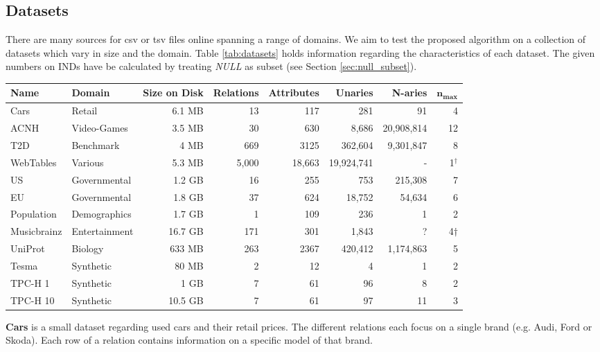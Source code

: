 \subsection{Datasets}
There are many sources for csv or tsv files online spanning a range of domains. We aim to test the proposed algorithm on a collection of datasets which vary in size and the domain. Table \ref{tab:datasets} holds information regarding the characteristics of each dataset. The given numbers on INDs have be calculated by treating \textit{NULL} as subset (see Section \ref{sec:null_subset}).

\begin{table*}[t]
    \centering
    \begin{tabular}{llrrrrrr}
        \hline
        \textbf{Name} & \textbf{Domain} & \textbf{Size on Disk} & \textbf{Relations} & \textbf{Attributes} & \textbf{Unaries} & \textbf{N-aries} & $\textbf{n}_\textbf{max}$ \\
        \hline
        Cars & Retail & 6.1 MB & 13 & 117 & 281 & 91 & 4 \\
        ACNH & Video-Games & 3.5 MB & 30 & 630 & 8,686 & 20,908,814 & 12 \\
        T2D & Benchmark & 4 MB & 669 & 3125 & 362,604 & 9,301,847 & 8 \\
        WebTables & Various & 5.3 MB & 5,000 & 18,663 & 19,924,741 & - & 1$^\dag$ \\
        US & Governmental & 1.2 GB & 16 & 255 & 753 & 215,308 & 7 \\
        EU & Governmental & 1.8 GB & 37 & 624 & 18,752 & 54,634 & 6 \\
        Population & Demographics & 1.7 GB & 1 & 109 & 236 & 1 & 2 \\
        Musicbrainz & Entertainment & 16.7 GB & 171 & 301 & 1,843 &  ? & 4$\dag$ \\
        UniProt & Biology & 633 MB & 263 & 2367 & 420,412 & 1,174,863 & 5 \\
        Tesma & Synthetic & 80 MB & 2 & 12 & 4 & 1 & 2 \\
        TPC-H 1 & Synthetic & 1 GB & 7 & 61 & 96 & 8 & 2 \\
        TPC-H 10 & Synthetic & 10.5 GB & 7 & 61 & 97 & 11 & 3 \\
        \hline
    \end{tabular}
    \caption{Datasets and their characteristics. Max n-ary layers marked with $^\dag$ are user defined limits.}
    \label{tab:datasets}
\end{table*}
\textbf{Cars} is a small dataset regarding used cars and their retail prices. The different relations each focus on a single brand (e.g. Audi, Ford or Skoda). Each row of a relation contains information on a specific model of that brand.

